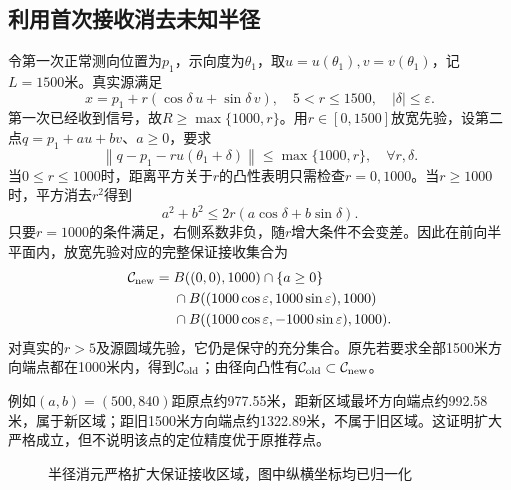 \documentclass[UTF8,a4paper,zihao=-4,fontset=windows]{ctexart}
\newcommand{\norm}[1]{\left\lVert#1\right\rVert}
\begin{document}
\subsection{利用首次接收消去未知半径}
令第一次正常测向位置为$p_1$，示向度为$\theta_1$，取$u=u(\theta_1),v=v(\theta_1)$，记$L=1500$米。真实源满足
\begin{equation}
x=p_1+r(\cos\delta\,u+\sin\delta\,v),\quad 5<r\le1500,\quad |\delta|\le\varepsilon.
\end{equation}
第一次已经收到信号，故$R\ge\max\{1000,r\}$。用$r\in[0,1500]$放宽先验，设第二点$q=p_1+au+bv$、$a\ge0$，要求
\begin{equation}\label{eq:coupling}
\norm{q-p_1-r u(\theta_1+\delta)}\le\max\{1000,r\},\quad\forall r,\delta.
\end{equation}
当$0\le r\le1000$时，距离平方关于$r$的凸性表明只需检查$r=0,1000$。当$r\ge1000$时，平方消去$r^2$得到
\begin{equation}
a^2+b^2\le2r(a\cos\delta+b\sin\delta).
\end{equation}
只要$r=1000$的条件满足，右侧系数非负，随$r$增大条件不会变差。因此在前向半平面内，放宽先验对应的完整保证接收集合为
\begin{equation}\label{eq:candidate}
\begin{aligned}
\mathcal C_{\rm new}={}&B((0,0),1000)\cap\{a\ge0\}\\
&\cap B((1000\cos\varepsilon,1000\sin\varepsilon),1000)\\
&\cap B((1000\cos\varepsilon,-1000\sin\varepsilon),1000).
\end{aligned}
\end{equation}
对真实的$r>5$及源圆域先验，它仍是保守的充分集合。原先若要求全部1500米方向端点都在1000米内，得到$\mathcal C_{\rm old}$；由径向凸性有$\mathcal C_{\rm old}\subset\mathcal C_{\rm new}$。

例如$(a,b)=(500,840)$距原点约977.55米，距新区域最坏方向端点约992.58米，属于新区域；距旧1500米方向端点约1322.89米，不属于旧区域。这证明扩大严格成立，但不说明该点的定位精度优于原推荐点。
\begin{figure}[htbp]\centering
{}
\caption{半径消元严格扩大保证接收区域，图中纵横坐标均已归一化}
\end{figure}
\end{document}
